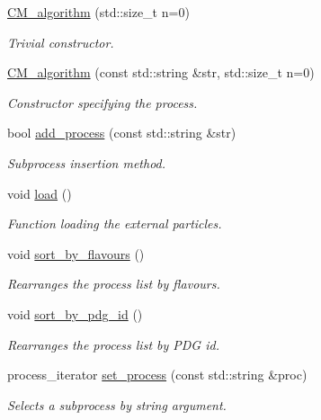 \begin{DoxyCompactItemize}
\item 
\hyperlink{a00070_a3df215ba1f51f54e224f0b78736c7e73}{C\-M\-\_\-algorithm} (std\-::size\-\_\-t n=0)
\begin{DoxyCompactList}\small\item\em Trivial constructor. \end{DoxyCompactList}\item 
\hyperlink{a00070_a4a5964ae509797fb3c98012f70671220}{C\-M\-\_\-algorithm} (const std\-::string \&str, std\-::size\-\_\-t n=0)
\begin{DoxyCompactList}\small\item\em Constructor specifying the process. \end{DoxyCompactList}\item 
bool \hyperlink{a00070_aff4e8ab6eb8afce8b5dd1694b69016e4}{add\-\_\-process} (const std\-::string \&str)
\begin{DoxyCompactList}\small\item\em Subprocess insertion method. \end{DoxyCompactList}\item 
void \hyperlink{a00070_a1af7990677b4e8f265d73ab900740733}{load} ()
\begin{DoxyCompactList}\small\item\em Function loading the external particles. \end{DoxyCompactList}\item 
void \hyperlink{a00070_a1054b354b10f88755707e77d6f53f4f9}{sort\-\_\-by\-\_\-flavours} ()
\begin{DoxyCompactList}\small\item\em Rearranges the process list by flavours. \end{DoxyCompactList}\item 
void \hyperlink{a00070_abd8c0a5f195b9637e308ba6cbaa57f7f}{sort\-\_\-by\-\_\-pdg\-\_\-id} ()
\begin{DoxyCompactList}\small\item\em Rearranges the process list by P\-D\-G id. \end{DoxyCompactList}\item 
process\-\_\-iterator \hyperlink{a00070_ae36c07e3ce35f8093575b71de905117d}{set\-\_\-process} (const std\-::string \&proc)
\begin{DoxyCompactList}\small\item\em Selects a subprocess by string argument. \end{DoxyCompactList}\item 

\end{DoxyCompactItemize}
